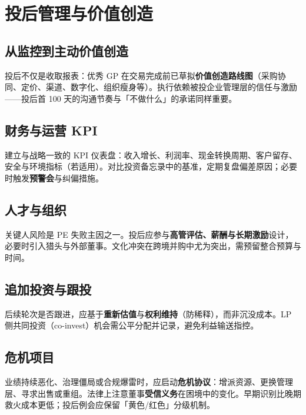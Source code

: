 \chapter{投后管理与价值创造}

\section{从监控到主动价值创造}

投后不仅是收取报表：优秀 GP 在交易完成前已草拟\textbf{价值创造路线图}（采购协同、定价、渠道、数字化、组织瘦身等）。执行依赖被投企业管理层的信任与激励——投后首 100 天的沟通节奏与「不做什么」的承诺同样重要。

\section{财务与运营 KPI}

建立与战略一致的 KPI 仪表盘：收入增长、利润率、现金转换周期、客户留存、安全与环境指标（若适用）。对比投资备忘录中的基准，定期复盘偏差原因；必要时触发\textbf{预警会}与纠偏措施。

\section{人才与组织}

关键人风险是 PE 失败主因之一。投后应参与\textbf{高管评估、薪酬与长期激励}设计，必要时引入猎头与外部董事。文化冲突在跨境并购中尤为突出，需预留整合预算与时间。

\section{追加投资与跟投}

后续轮次是否跟进，应基于\textbf{重新估值}与\textbf{权利维持}（防稀释），而非沉没成本。LP 侧共同投资（co-invest）机会需公平分配并记录，避免利益输送指控。

\section{危机项目}

业绩持续恶化、治理僵局或合规爆雷时，应启动\textbf{危机协议}：增派资源、更换管理层、寻求出售或重组。法律上注意董事\textbf{受信义务}在困境中的变化。早期识别比晚期救火成本更低；投后例会应保留「黄色/红色」分级机制。
